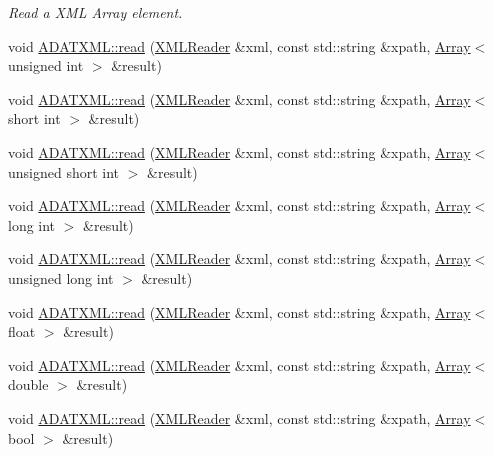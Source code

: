 \begin{DoxyCompactItemize}
\begin{DoxyCompactList}\small\item\em Read a X\+ML Array element. \end{DoxyCompactList}\item 
void \mbox{\hyperlink{group__io_ga2eaf76c05e59884bd34813884eef708b}{A\+D\+A\+T\+X\+M\+L\+::read}} (\mbox{\hyperlink{classADATXML_1_1XMLReader}{X\+M\+L\+Reader}} \&xml, const std\+::string \&xpath, \mbox{\hyperlink{classXMLArray_1_1Array}{Array}}$<$ unsigned int $>$ \&result)
\item 
void \mbox{\hyperlink{group__io_gaa9246e7914f16a84371b00a4910a535a}{A\+D\+A\+T\+X\+M\+L\+::read}} (\mbox{\hyperlink{classADATXML_1_1XMLReader}{X\+M\+L\+Reader}} \&xml, const std\+::string \&xpath, \mbox{\hyperlink{classXMLArray_1_1Array}{Array}}$<$ short int $>$ \&result)
\item 
void \mbox{\hyperlink{group__io_ga778f9eca273d2180afff1ba58606a153}{A\+D\+A\+T\+X\+M\+L\+::read}} (\mbox{\hyperlink{classADATXML_1_1XMLReader}{X\+M\+L\+Reader}} \&xml, const std\+::string \&xpath, \mbox{\hyperlink{classXMLArray_1_1Array}{Array}}$<$ unsigned short int $>$ \&result)
\item 
void \mbox{\hyperlink{group__io_ga28f3bc5eedbefea7d81064c339e72f97}{A\+D\+A\+T\+X\+M\+L\+::read}} (\mbox{\hyperlink{classADATXML_1_1XMLReader}{X\+M\+L\+Reader}} \&xml, const std\+::string \&xpath, \mbox{\hyperlink{classXMLArray_1_1Array}{Array}}$<$ long int $>$ \&result)
\item 
void \mbox{\hyperlink{group__io_gae84bf39f198c8718403a15bc408a09a1}{A\+D\+A\+T\+X\+M\+L\+::read}} (\mbox{\hyperlink{classADATXML_1_1XMLReader}{X\+M\+L\+Reader}} \&xml, const std\+::string \&xpath, \mbox{\hyperlink{classXMLArray_1_1Array}{Array}}$<$ unsigned long int $>$ \&result)
\item 
void \mbox{\hyperlink{group__io_gab83c1ad39e65d00b48e6e4b0611c270f}{A\+D\+A\+T\+X\+M\+L\+::read}} (\mbox{\hyperlink{classADATXML_1_1XMLReader}{X\+M\+L\+Reader}} \&xml, const std\+::string \&xpath, \mbox{\hyperlink{classXMLArray_1_1Array}{Array}}$<$ float $>$ \&result)
\item 
void \mbox{\hyperlink{group__io_gade490f5b9db35aa7bc58c6bb07848048}{A\+D\+A\+T\+X\+M\+L\+::read}} (\mbox{\hyperlink{classADATXML_1_1XMLReader}{X\+M\+L\+Reader}} \&xml, const std\+::string \&xpath, \mbox{\hyperlink{classXMLArray_1_1Array}{Array}}$<$ double $>$ \&result)
\item 
void \mbox{\hyperlink{group__io_gaea910d2bb1864c350f979d14f6c1527f}{A\+D\+A\+T\+X\+M\+L\+::read}} (\mbox{\hyperlink{classADATXML_1_1XMLReader}{X\+M\+L\+Reader}} \&xml, const std\+::string \&xpath, \mbox{\hyperlink{classXMLArray_1_1Array}{Array}}$<$ bool $>$ \&result)

\end{DoxyCompactItemize}
